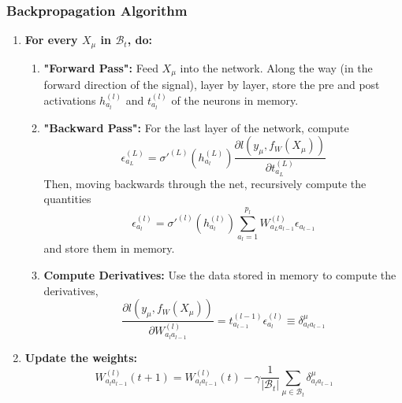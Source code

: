 \documentclass{article}
\begin{document}
\subsubsection*{Backpropagation Algorithm}
\begin{enumerate}
    \item \textbf{For every $X_{\mu}$ in $\mathcal{B}_t$, do:}
    \begin{enumerate}
        \item \textbf{"Forward Pass":}
        Feed $X_{\mu}$ into the network. Along the way (in the forward direction of the signal), layer by layer, store the pre and post activations $h^{(l)}_{a_l}$ and $t^{(l)}_{a_l}$ of the neurons in memory.
        \item \textbf{"Backward Pass":}
        For the last layer of the network, compute
        \begin{equation}
            \epsilon^{(L)}_{a_{L}}
            =
            \sigma'^{(L)} (h^{(L)}_{a_l})
            \frac{\partial l(y_{\mu}, f_W(X_{\mu}))}{\partial t^{(L)}_{a_L}}
        \end{equation}
        Then, moving backwards through the net, recursively compute the quantities
        \begin{equation}
            \epsilon^{(l)}_{a_{l}}
            =
            \sigma'^{(l)} (h^{(l)}_{a_l})
            \sum_{a_l=1}^{p_l}
            W^{(l)}_{a_L a_{l-1}}
            \epsilon_{a_{l-1}}
        \end{equation}
        and store them in memory.
        \item \textbf{Compute Derivatives:}
        Use the data stored in memory to compute the derivatives,
        \begin{equation}
            \frac{\partial l(y_{\mu}, f_W(X_{\mu}))}{\partial W^{(l)}_{a_l a_{l-1}}}
            =
            t^{(l-1)}_{a_{l-1}}
            \epsilon^{(l)}_{a_{l}}
            \equiv
            \delta_{a_l a_{l-1}}^{\mu}
        \end{equation}
    \end{enumerate}
    \item \textbf{Update the weights:}
    \begin{equation}
        W^{(l)}_{a_l a_{l-1}} (t+1)
            =
            W^{(l)}_{a_l a_{l-1}} (t)
            - \gamma \frac{1}{|\mathcal{B}_t|}
            \sum_{\mu \in \mathcal{B}_t}
            \delta_{a_l a_{l-1}}^{\mu}
    \end{equation}
\end{enumerate}
\end{document}
